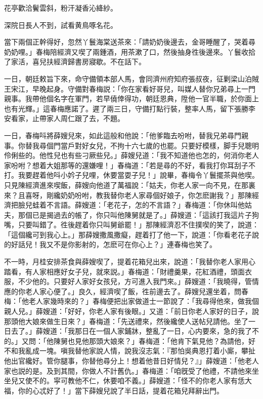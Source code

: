 \begin{myquote}
花亭歡洽鬢雲斜，粉汗凝香沁絳紗。

深院日長人不到，試看黄鳥啄名花。
\end{myquote}

當下兩個正幹得好，忽然丫鬟海棠送茶來：「請奶奶後邊去，金哥睡醒了，哭着尋奶奶哩。」春梅陪經濟又喫了兩鍾酒，用茶漱了口，然後抽身徃後邊來。丫鬟收拾了家活，喜兒扶經濟歸書房寢歇。不在話下。

一日，朝廷敕旨下來，命守備領本部人馬，會同濟州府知府張叔夜，征剿梁山泊賊王宋江，早晚起身。守備對春梅説：「你在家看好哥兒，叫媒人替你兄弟尋上一門親事。我帶他個名字在軍門，若早僥倖得功，朝廷恩典，陞他一官半職，於你面上也有光輝。」這春梅應諾了。遲了兩三日，守備打點行裝，整率人馬，留下張勝李安看家，止帶家人周仁跟了去，不題。

一日，春梅呌將薛嫂兒來，如此這般和他說：「他爹臨去吩咐，替我兄弟尋門親事。你替我尋個門當戶對好女兒，不拘十六七歲的也罷。只要好模樣，脚手兒聰明伶俐些的。他性兒也有些刁厥些兒。」薛嫂兒道：「我不知道他也怎的，何消你老人家吩咐？想着大姐那等的還嫌哩！」春梅道：「若是尋的不好，看我打你耳刮子不打。我要趕着他呌小妗子兒哩，休要當耍子兒！」說畢，春梅令丫鬟擺茶與他喫。只見陳經濟進來喫飯，薛嫂向他道了萬福說：「姑夫，你老人家一向不見，在那裏來？且喜呀，剛纔奶奶吩咐，教我替你老人家尋個好娘子，你怎麽謝我？」那陳經濟把臉兒蛙着不言語。薛嫂道：「老花子，怎的不言語？」春梅道：「你休叫他姑夫，那個已是揭過去的帳了，你只叫他陳舅就是了。」薛嫂道：「這該打我這片子狗嘴，只要叫錯了。徃後趕着你只叫舅爺罷！」那陳經濟忍不住撲喫的笑了，說道：「這個纔可到我心上。」那薛嫂撒風撒癡，趕着打了他一下，說道：「你看老花子說的好話兒！我又不是你影射的，怎麽可在你心上？」連春梅也笑了。

不一時，月桂安排茶食與薛嫂喫了，提着花箱兒出來，說道：「我替你老人家用心踏看，有人家相應好女子兒，就來説。」春梅道：「財禮羹果，花紅酒禮，頭面衣服，不少他的。只要好人家好女孩兒，方可進入我門來。」薛嫂道：「我曉得，管情應的你老人家心便了。」良久，經濟喫了飯，徃前邊去了。薛嫂兒還坐着，問春梅：「他老人家幾時來的？」春梅便把出家做道士一節說了：「我尋得他來，做我個親人兒。」薛嫂道：「好好，你老人家有後眼。」又道：「前日你老人家好的日子，說那頭他大娘來做生日來？」春梅道：「先送禮來，然後纔使人送帖兒請他。坐了一日去了。」薛嫂道：「我那日在一個人家鋪牀，整亂了一日，心内要來，急的我了不的。」又問：「他陳舅也見他那頭大娘來？」春梅道：「他肯下氣見他？為請他，好不和我亂成一塊。嗔我替他家說人情，說我沒志氣：『那怕吳典恩打着小廝，攀扯他出官纔好。管你腿事，你替他尋分上！想着他昔日好情兒？』」薛嫂道：「他老人家也説的是。及到其間，你做人不計舊仇。」春梅道：「咱旣受了他禮，不請他來坐坐兒又使不的。寜可教他不仁，休要咱不義。」薛嫂道：「怪不的你老人家有恁大福，你的心忒好了！」當下薛嫂兒說了半日話，提着花箱兒拜辭出門。

